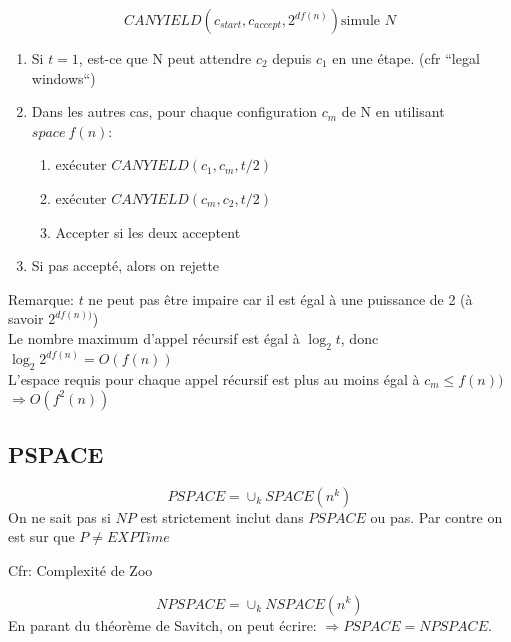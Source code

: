 \documentclass[a4paper,12pt]{article}
\begin{document}
    $$CANYIELD(c_{start}, c_{accept}, 2^{df(n)}) \text{simule } N$$
    \begin{enumerate}
      \item Si $t = 1$, est-ce que N peut attendre $c_2$ depuis $c_1$ en une étape.  (cfr ``legal windows``)
      \item Dans les autres cas, pour chaque configuration $c_m$ de N en utilisant $space\ f(n)$:
	\begin{enumerate}
	  \item exécuter $CANYIELD(c_1, c_m, t/2)$
	  \item exécuter $CANYIELD(c_m, c_2, t/2)$
	  \item Accepter si les deux acceptent
	\end{enumerate}
      \item Si pas accepté, alors on rejette
    \end{enumerate}
    Remarque: $t$ ne peut pas être impaire car il est égal à une puissance de 2 (à savoir $2^{df(n))}$)\\
    
    Le nombre maximum d'appel récursif est égal à $\log_2 t$, donc $\log_2 2^{df(n)} = O(f(n))$\\
    L'espace requis pour chaque appel récursif est plus au moins égal à $c_m \leq f(n))$\\
    $\Rightarrow O(f^2(n))$
    
    
  \subsection{PSPACE}
    $$PSPACE = \cup_{k} SPACE(n^k)$$
    On ne sait pas si $NP$ est strictement inclut dans $PSPACE$ ou pas.  Par contre on est sur que $P \neq EXPTime$
    
    Cfr: Complexité de Zoo
    
    $$NPSPACE = \cup_{k} NSPACE(n^k)$$
    En parant du théorème de Savitch, on peut écrire: $\Rightarrow PSPACE = NPSPACE$.
    
\end{document}
